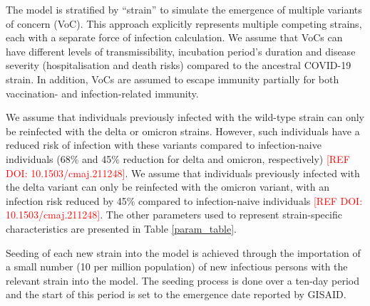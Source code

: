 
The model is stratified by ``strain'' to simulate the emergence of multiple variants of concern (VoC).
This approach explicitly represents multiple competing strains, each with a separate force of infection calculation.
We assume that VoCs can have different levels of transmissibility, incubation period's duration and disease severity 
(hospitalisation and death risks) compared to the ancestral COVID-19 strain. In addition, VoCs are assumed to escape 
immunity partially for both vaccination- and infection-related immunity. 

We assume that individuals previously infected with the wild-type strain can only be reinfected with the delta or 
omicron strains. However, such individuals have a reduced risk of infection with these variants compared to 
infection-naive individuals (68\% and 45\% reduction for delta and omicron, respectively) \textcolor{red}{[REF DOI: 10.1503/cmaj.211248]}.
We assume that individuals previously infected with the delta variant can only be reinfected with the omicron variant, 
with an infection risk reduced by 45\% compared to infection-naive individuals \textcolor{red}{[REF DOI: 10.1503/cmaj.211248]}. 
The other parameters used to represent strain-specific characteristics are presented in Table \ref{param_table}.

Seeding of each new strain into the model is achieved through the importation of a small number (10 per million population) of new infectious persons with the relevant strain into the model.
The seeding process is done over a ten-day period and the start of this period is set to the emergence date reported by GISAID.
